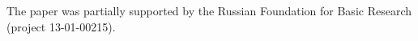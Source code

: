 









\Ack


\noindent


The paper was partially supported by the Russian Foundation for Basic Research (project 13-01-00215).








\vspace*{-2pt}











\renewcommand{\bibname}{\protect\rmfamily References}







